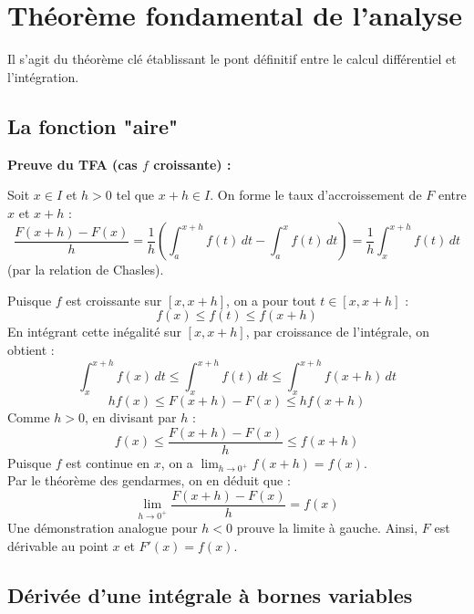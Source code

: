 \documentclass{article}
\begin{document}
\section{Théorème fondamental de l'analyse}

Il s'agit du théorème clé établissant le pont définitif entre le calcul différentiel et l'intégration.

\subsection{La fonction "aire"}

\noindent\textbf{Preuve du TFA (cas $f$ croissante) :}\par\vspace{0.5em}
Soit $x \in I$ et $h > 0$ tel que $x+h \in I$. On forme le taux d'accroissement de $F$ entre $x$ et $x+h$ :
$$\frac{F(x+h) - F(x)}{h} = \frac{1}{h} \left( \int_{a}^{x+h} f(t)\,dt - \int_{a}^{x} f(t)\,dt \right) = \frac{1}{h} \int_{x}^{x+h} f(t)\,dt$$ (par la relation de Chasles).

Puisque $f$ est croissante sur $[x, x+h]$, on a pour tout $t \in [x, x+h]$ :
$$f(x) \le f(t) \le f(x+h)$$
En intégrant cette inégalité sur $[x, x+h]$, par croissance de l'intégrale, on obtient :
$$\int_{x}^{x+h} f(x) \, dt \le \int_{x}^{x+h} f(t) \, dt \le \int_{x}^{x+h} f(x+h) \, dt$$
$$h f(x) \le F(x+h) - F(x) \le h f(x+h)$$
Comme $h > 0$, en divisant par $h$ :
$$f(x) \le \frac{F(x+h) - F(x)}{h} \le f(x+h)$$
Puisque $f$ est continue en $x$, on a $\lim_{h \to 0^+} f(x+h) = f(x)$.\\
Par le théorème des gendarmes, on en déduit que :
$$\lim_{h \to 0^+} \frac{F(x+h) - F(x)}{h} = f(x)$$
Une démonstration analogue pour $h < 0$ prouve la limite à gauche. Ainsi, $F$ est dérivable au point $x$ et $F'(x) = f(x)$.\\

\subsection{Dérivée d'une intégrale à bornes variables}
\end{document}
